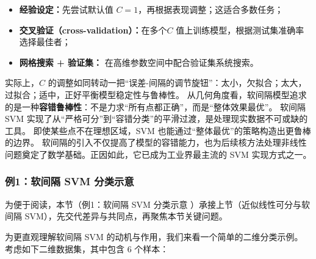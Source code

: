 \begin{itemize}
\item {\bf 经验设定：}先尝试默认值 $C=1$，再根据表现调整；这适合多数任务；
\item {\bf 交叉验证（cross-validation）：}在多个$C$ 值上训练模型，根据测试集准确率选择最佳者；
\item {\bf 网格搜索 + 验证集：} 在高维参数空间中配合验证集系统搜索。
\end{itemize}
实际上，$C$  的调整如同转动一把“误差-间隔的调节旋钮”：太小，欠拟合；太大，过拟合；适中，正好平衡模型稳定性与鲁棒性。
从几何角度看，软间隔模型追求的是一种{\bf 容错鲁棒性}：不是力求“所有点都正确”，而是“整体效果最优”。
软间隔 SVM 实现了从“严格可分”到“容错分类”的平滑过渡，是处理现实数据不可或缺的工具。
即使某些点不在理想区域，SVM 也能通过“整体最优”的策略构造出更鲁棒的边界。
%
软间隔的引入不仅提高了模型的容错能力，也为后续核方法处理非线性问题奠定了数学基础。正因如此，它已成为工业界最主流的 SVM 实现方式之一。

\subsubsection*{例1：软间隔 SVM 分类示意 }

为便于阅读，本节（例1：软间隔 SVM 分类示意 ）承接上节（近似线性可分与软间隔 SVM），先交代差异与共同点，再聚焦本节关键问题。

为更直观理解软间隔 SVM 的动机与作用，我们来看一个简单的二维分类示例。
考虑如下二维数据集，其中包含 6 个样本：

